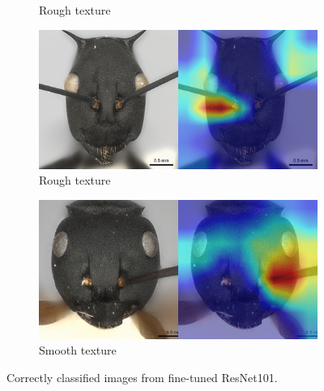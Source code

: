 \documentclass{aci}
\numberwithin{equation}{section}
\begin{document}
\begin{figure}
\begin{subfigure}{\subwidth}
        \caption*{Rough texture}
        \label{fig:correct_nonideal_1554}
    \end{subfigure}
    \begin{subfigure}{\subwidth}
        \includegraphics[width=1\linewidth]{thesis_assets/gradcam/correct_nonideal/1694.png}
        \caption*{Rough texture}
        \label{fig:correct_nonideal_1694}
    \end{subfigure}
    \begin{subfigure}{\subwidth}
        \includegraphics[width=1\linewidth]{thesis_assets/gradcam/correct_nonideal/388.png}
        \caption*{Smooth texture}
        \label{fig:correct_nonideal_388}
    \end{subfigure}
    \caption{Correctly classified images from fine-tuned ResNet101.}
    \label{fig:correct_images}
\end{figure}
\end{document}
